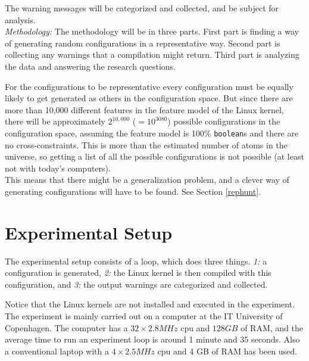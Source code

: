 \documentclass[a4paper,11pt]{report}
\begin{document}
The warning messages will be categorized and collected, and be subject for 
analysis.
\\

\emph{Methodology:}
The methodology will be in three parts. First part is finding a way of
generating random configurations in a representative way. Second part is 
collecting any warnings that a compilation might return. Third part is 
analyzing the data and answering the research questions.
\\

        \def \fn{Not counting cross-tree contraints, but also saying 
        everything is a \texttt{boolean} and not \texttt{tristate}, or 
        \texttt{string}.}

For the configurations to be representative every configuration must be equally 
likely to get generated as others in the configuration space. But since there are more than 
10,000 different features in the feature model of the Linux kernel, there will 
be approximately $2^{10,000}$ ($=10^{3080}$) possible configurations in the 
configuration space, assuming the feature model is 100\% \texttt{boolean}s and 
there are no cross-constraints.  This is more than the estimated number of 
atoms in the universe, so getting a list of all the possible configurations is 
not possible (at least not with today's computers).
\\

This means that there might be a generalization problem, and a clever way of 
generating configurations will have to be found. See Section \ref{rephunt}.



            \section{Experimental Setup}
The experimental setup consists of a loop, which does three things. \emph{1:} a 
configuration is generated, \emph{2:} the Linux kernel is then compiled with 
this configuration, and \emph{3:} the output warnings are categorized and 
collected.

Notice that the Linux kernels are not installed and executed in the experiment.
\\

The experiment is mainly carried out on a computer at the IT University 
of Copenhagen. The computer has a $32\times2.8 MHz$ cpu and $128 GB$ of RAM, and the 
average time to run an experiment loop is around 1 minute and 35 
seconds. Also a conventional laptop with a $4\times2.5 MHz$  cpu and 4 GB of RAM has 
been used.
\\
\end{document}

